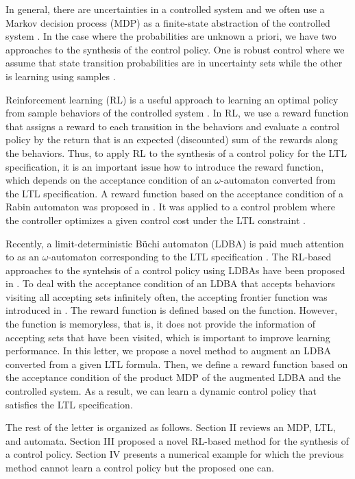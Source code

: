 \documentclass[letterpaper, 10 pt, conference]{ieeeconf}  %
\begin{document}
In general, there are uncertainties in a controlled system and we often use a Markov decision process (MDP) as a finite-state abstraction of the controlled system \cite{Puterman}.
In the case where the probabilities are unknown a priori, we have two approaches to the synthesis of the control policy. One is robust control where we assume that state transition probabilities are in uncertainty sets \cite{WTM2012} while the other is learning using samples \cite{Sadigh2014}.

Reinforcement learning (RL) is a useful approach to learning an optimal policy from sample behaviors of the controlled system \cite{Sutton}.
In RL, we use a reward function that assigns a reward to each transition in the behaviors and evaluate a control policy by the return that is an expected (discounted) sum of the rewards along the behaviors.
Thus, to apply RL to the synthesis of a control policy for the LTL specification, it is an important issue how to introduce the reward function, which depends on the acceptance condition of an $\omega$-automaton converted from the LTL specification.
A reward function based on the acceptance condition of a Rabin automaton was proposed in \cite{Sadigh2014}. It was applied to a control problem where the controller optimizes a given control cost under the LTL constraint \cite{HU2015}.

Recently, a limit-deterministic B\"{u}chi automaton (LDBA) is paid much attention to as an $\omega$-automaton corresponding to the LTL specification \cite{SEJK2016}.
The RL-based approaches to the syntehsis of a control policy using LDBAs have been proposed in \cite{HAK2019,Hahn2019,HKAKPL2019,BWZP2019}.
To deal with the acceptance condition of an LDBA that accepts behaviors visiting all accepting sets infinitely often, the accepting frontier function was introduced in \cite{HAK2019,HKAKPL2019}. The reward function is defined based on the function.
However, the function is memoryless, that is, it does not provide the information of accepting sets that have been visited, which is important to improve learning performance.
In this letter, we propose a novel method to augment an LDBA converted from a given LTL formula.
Then, we define a reward function based on the acceptance condition of the product MDP of the augmented LDBA and the controlled system.
As a result, we can learn a dynamic control policy that satisfies the LTL specification.

The rest of the letter is organized as follows.
Section II reviews an MDP, LTL, and automata.
Section III proposed a novel RL-based method for the synthesis of a control policy.
Section IV presents a numerical example for which the previous method cannot learn a control policy but the proposed one can.
\end{document}
